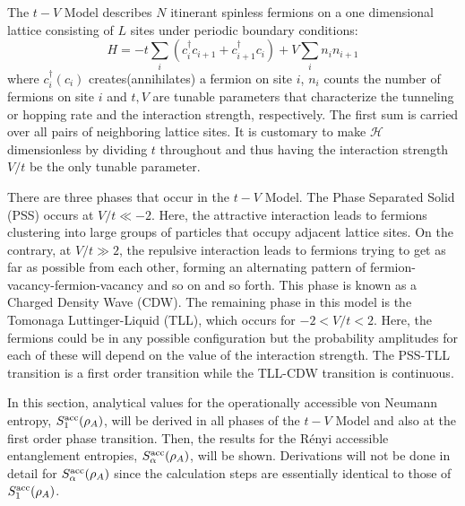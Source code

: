 The $t-V$ Model describes $N$ itinerant spinless fermions on a one dimensional lattice consisting of $L$ sites under periodic boundary conditions:
%
\begin{equation}
H = -t \sum_{i} \left ( c_{i}^{\dag} c_{i+1} + c_{i+1}^{\dag} c_{i} \right )+ V \sum_{i} n_i n_{i+1} 
\label{eq:t-VModel}
\end{equation}
%
where $c^{\dag}_i(c_{i})$ creates(annihilates) a fermion on site $i$, $n_i$ counts the number of fermions on site $i$ and $t,V$ are tunable parameters that characterize the tunneling or hopping rate and the interaction strength, respectively. The first sum is carried over all pairs of neighboring lattice sites. It is customary to make $\mathcal{H}$ dimensionless by dividing $t$ throughout and thus having the interaction strength $V/t$ be the only tunable parameter.

There are three phases that occur in the $t-V$ Model. The Phase Separated Solid (PSS) occurs at $V/t \ll -2$. Here, the attractive interaction leads to fermions clustering into large groups of particles that occupy adjacent lattice sites. On the contrary, at $V/t \gg 2$, the repulsive interaction leads to fermions trying to get as far as possible from each other, forming an alternating pattern of fermion-vacancy-fermion-vacancy and so on and so forth. This phase is known as a Charged Density Wave (CDW). The remaining phase in this model is the Tomonaga Luttinger-Liquid (TLL), which occurs for $-2 < V/t < 2$. Here, the fermions could be in any possible configuration but the probability amplitudes for each of these will depend on the value of the interaction strength. The PSS-TLL transition is a first order transition while the TLL-CDW transition is continuous.

In this section, analytical values for the operationally accessible von Neumann entropy, $S_{1}^{\rm acc}(\rho_A)$, will be derived in all phases of the $t-V$ Model and also at the first order phase transition. Then, the results for the R\'enyi accessible entanglement entropies, $S_{\alpha}^{\rm acc}(\rho_A)$, will be shown. Derivations will not be done in detail for $S_{\alpha}^{\rm acc}(\rho_A)$ since the calculation steps are essentially identical to those of $S_{1}^{\rm acc}(\rho_A)$.

